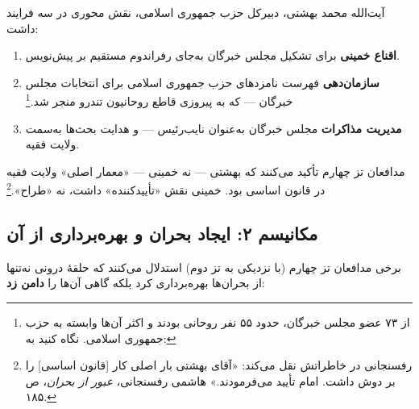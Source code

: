 \documentclass[12pt,a4paper]{book}
\newcommand{\keyword}[1]{\textbf{\textcolor{cPrimary}{#1}}}
\newcommand{\en}[1]{\lr{\textit{#1}}}
\begin{document}
\begin{warningBox}
آیت‌الله محمد بهشتی، دبیرکل حزب جمهوری اسلامی، نقش محوری در سه فرایند داشت:

\begin{enumerate}[label=\textcolor{cAccent}{\bfseries\arabic*.}, rightmargin=2em]
    \item \textbf{اقناع خمینی} برای تشکیل مجلس خبرگان به‌جای رفراندوم مستقیم بر پیش‌نویس.
    \item \textbf{سازمان‌دهی} فهرست نامزدهای حزب جمهوری اسلامی برای انتخابات مجلس خبرگان — که به پیروزی قاطع روحانیون تندرو منجر شد.\footnote{از ۷۳ عضو مجلس خبرگان، حدود ۵۵ نفر روحانی بودند و اکثر آن‌ها وابسته به حزب جمهوری اسلامی. نگاه کنید به: \en{Schirazi (1997), pp.\,30--38.}}
    \item \textbf{مدیریت مذاکرات} مجلس خبرگان به‌عنوان نایب‌رئیس — و هدایت بحث‌ها به‌سمت ولایت فقیه.
\end{enumerate}
\end{warningBox}

مدافعان تز چهارم تأکید می‌کنند که بهشتی — نه خمینی — «معمار اصلی» ولایت فقیه در قانون اساسی بود. خمینی نقش «تأییدکننده» داشت، نه «طراح».\footnote{رفسنجانی در خاطراتش نقل می‌کند: «آقای بهشتی بار اصلی کار [قانون اساسی] را بر دوش داشت. امام تأیید می‌فرمودند.» هاشمی رفسنجانی، \textit{عبور از بحران}، ص ۱۸۵.}

\subsection{مکانیسم ۲: ایجاد بحران و بهره‌برداری از آن}

برخی مدافعان تز چهارم (با نزدیکی به تز دوم) استدلال می‌کنند که حلقهٔ درونی نه‌تنها از بحران‌ها بهره‌برداری کرد بلکه گاهی آن‌ها را \keyword{دامن زد}:
\end{document}
